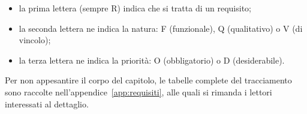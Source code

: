 \begin{itemize}
  \item la prima lettera (sempre R) indica che si tratta di un requisito;
  \item la seconda lettera ne indica la natura: F (funzionale), Q
        (qualitativo) o V (di vincolo);
  \item la terza lettera ne indica la priorità: O (obbligatorio) o D
        (desiderabile).
\end{itemize}

Per non appesantire il corpo del capitolo, le tabelle
complete del tracciamento sono raccolte nell'appendice~\ref{app:requisiti},
alle quali si rimanda i lettori interessati al dettaglio.

